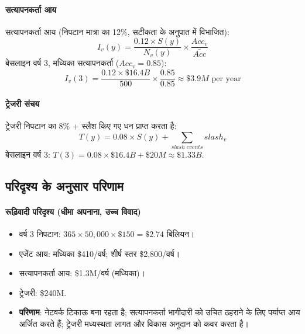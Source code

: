 \documentclass[11pt]{article}
\begin{document}
\begin{itemize}[noitemsep]
\begin{itemize}[noitemsep]
\paragraph{सत्यापनकर्ता आय} सत्यापनकर्ता आय (निपटान मात्रा का 12\%, सटीकता के अनुपात में विभाजित):
\begin{equation}
I_v(y) = \frac{0.12 \times S(y)}{N_v(y)} \times \frac{Acc_v}{\bar{Acc}}
\end{equation}
बेसलाइन वर्ष 3, मध्यिका सत्यापनकर्ता ($Acc_v = 0.85$):
\begin{equation}
I_v(3) = \frac{0.12 \times \$16.4B}{500} \times \frac{0.85}{0.85} \approx \$3.9M \text{ per year}
\end{equation}

\paragraph{ट्रेजरी संचय} ट्रेजरी निपटान का 8\% + स्लैश किए गए धन प्राप्त करता है:
\begin{equation}
T(y) = 0.08 \times S(y) + \sum_{slash \; events} slash_v
\end{equation}
बेसलाइन वर्ष 3: $T(3) = 0.08 \times \$16.4B + \$20M \approx \$1.33B$.

\subsection{परिदृश्य के अनुसार परिणाम}
\paragraph{रूढ़िवादी परिदृश्य (धीमा अपनाना, उच्च विवाद)}
\begin{itemize}[noitemsep]
  \item वर्ष 3 निपटान: $365 \times 50{,}000 \times \$150 = \$2.74$ बिलियन।
  \item एजेंट आय: मध्यिका \$410/वर्ष; शीर्ष स्तर \$2{,}800/वर्ष।
  \item सत्यापनकर्ता आय: \$1.3M/वर्ष (मध्यिका)।
  \item ट्रेजरी: \$240M.
  \item \textbf{परिणाम}: नेटवर्क टिकाऊ बना रहता है; सत्यापनकर्ता भागीदारी को उचित ठहराने के लिए पर्याप्त आय अर्जित करते हैं; ट्रेजरी मध्यस्थता लागत और विकास अनुदान को कवर करता है।
\end{itemize}


\end{itemize}
\end{itemize}
\end{document}
